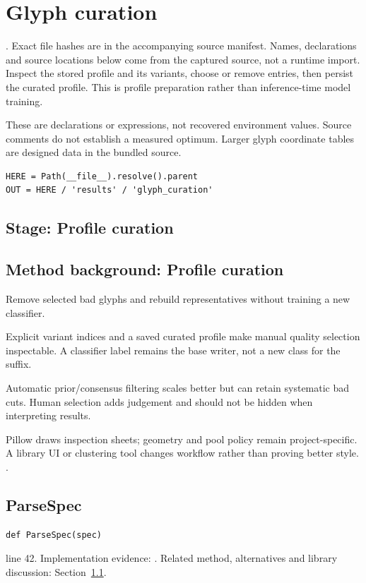 \chapter{Glyph curation}\label{module:curate}
. Exact file hashes are in the accompanying source manifest. Names, declarations and source locations below come from the captured source, not a runtime import.
Inspect the stored profile and its variants, choose or remove entries, then persist the curated profile. This is profile preparation rather than inference-time model training.


These are declarations or expressions, not recovered environment values. Source comments do not establish a measured optimum. Larger glyph coordinate tables are designed data in the bundled source.
\begin{lstlisting}[style=plain]
HERE = Path(__file__).resolve().parent
OUT = HERE / 'results' / 'glyph_curation'
\end{lstlisting}
\section*{Stage: Profile curation}
\section{Method background: Profile curation}\label{method:curate}
Remove selected bad glyphs and rebuild representatives without training a new classifier.


Explicit variant indices and a saved curated profile make manual quality selection inspectable. A classifier label remains the base writer, not a new class for the suffix.


Automatic prior/consensus filtering scales better but can retain systematic bad cuts. Human selection adds judgement and should not be hidden when interpreting results.


Pillow draws inspection sheets; geometry and pool policy remain project-specific. A library UI or clustering tool changes workflow rather than proving better style. \cite{code2026,haines2016,pillowdraw}.


\section{ParseSpec}\label{fn:curate:ParseSpec}
\begin{lstlisting}[style=sig]
def ParseSpec(spec)
\end{lstlisting}
 line 42. Implementation evidence: \cite{code2026}. Related method, alternatives and library discussion: Section~\ref{method:curate}.


